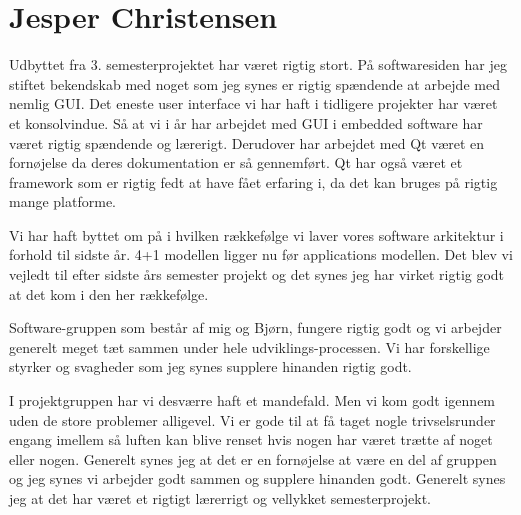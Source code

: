 \section{Jesper Christensen}
Udbyttet fra 3. semesterprojektet har været rigtig stort. På softwaresiden har jeg stiftet bekendskab med noget som jeg synes er rigtig spændende at arbejde med nemlig GUI. Det eneste user interface vi har haft i tidligere projekter har været et konsolvindue. Så at vi i år har arbejdet med GUI i embedded software har været rigtig spændende og lærerigt. Derudover har arbejdet med Qt været en fornøjelse da deres dokumentation er så gennemført. Qt har også været et framework som er rigtig fedt at have fået erfaring i, da det kan bruges på rigtig mange platforme.

Vi har haft byttet om på i hvilken rækkefølge vi laver vores software arkitektur i forhold til sidste år. 4+1 modellen ligger nu før applications modellen. Det blev vi vejledt til efter sidste års semester projekt og det synes jeg har virket rigtig godt at det kom i den her rækkefølge.

Software-gruppen som består af mig og Bjørn, fungere rigtig godt og vi arbejder generelt meget tæt sammen under hele udviklings-processen. Vi har forskellige styrker og svagheder som jeg synes supplere hinanden rigtig godt.

I projektgruppen har vi desværre haft et mandefald. Men vi kom godt igennem uden de store problemer alligevel. Vi er gode til at få taget nogle trivselsrunder engang imellem så luften kan blive renset hvis nogen har været trætte af noget eller nogen. Generelt synes jeg at det er en fornøjelse at være en del af gruppen og jeg synes vi arbejder godt sammen og supplere hinanden godt. Generelt synes jeg at det har været et rigtigt lærerrigt og vellykket semesterprojekt.
